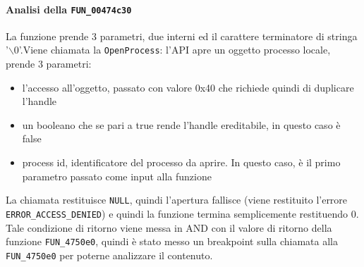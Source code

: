 \documentclass[12pt]{extarticle}
\begin{document}
\paragraph{Analisi della \texttt{FUN\_00474c30}} La funzione prende 3 parametri, due interni ed il carattere terminatore di stringa '$\backslash$0'.Viene chiamata la \texttt{OpenProcess}: l'API apre un oggetto processo locale, prende 3 parametri:
\begin{itemize}
    \item l'accesso all'oggetto, passato con valore 0x40 che richiede quindi di duplicare l'handle
    \item un booleano che se pari a true rende l'handle ereditabile, in questo caso è false
    \item process id, identificatore del processo da aprire. In questo caso, è il primo parametro passato come input alla funzione
\end{itemize}
La chiamata restituisce \texttt{NULL}, quindi l'apertura fallisce (viene restituito l'errore \texttt{ERROR\_ACCESS\_DENIED}) e quindi la funzione termina semplicemente restituendo 0.\\Tale condizione di ritorno viene messa in AND con il valore di ritorno della funzione \texttt{FUN\_4750e0}, quindi è stato messo un breakpoint sulla chiamata alla \texttt{FUN\_4750e0} per poterne analizzare il contenuto.
\end{document}
